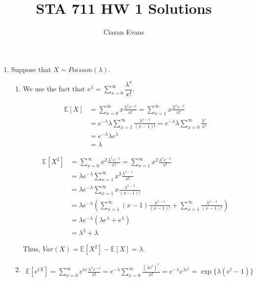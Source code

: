 \documentclass[12pt]{article}
\title{STA 711 HW 1 Solutions}
\author{Ciaran Evans}
\date{}
\begin{document}
\maketitle

\begin{enumerate}
\item Suppose that $X \sim Poisson(\lambda)$.

\begin{enumerate}
\item We use the fact that $e^\lambda = \sum \limits_{x=0}^{\infty} \dfrac{\lambda^{x}}{x!}$.

\begin{align*}
\mathbb{E}[X] &= \sum \limits_{x=0}^{\infty} x \frac{\lambda^x e^{-\lambda}}{x!} = \sum \limits_{x=1}^{\infty} x \frac{\lambda^x e^{-\lambda}}{x!} \\ 
&= e^{-\lambda} \lambda \sum \limits_{x=1}^{\infty} \frac{\lambda^{x-1}}{(x-1)!} = e^{-\lambda} \lambda \sum \limits_{x=0}^{\infty} \frac{\lambda^{x}}{x!} \\
&= e^{-\lambda} \lambda e^{\lambda} \\
&= \lambda
\end{align*}

\begin{align*}
\mathbb{E}[X^2] &= \sum \limits_{x=0}^{\infty} x^2 \frac{\lambda^x e^{-\lambda}}{x!} = \sum \limits_{x=1}^{\infty} x^2 \frac{\lambda^x e^{-\lambda}}{x!} \\
&= \lambda e^{-\lambda} \sum \limits_{x=1}^{\infty} x^2 \frac{\lambda^{x-1}}{x!} \\
&= \lambda e^{-\lambda} \sum \limits_{x=1}^{\infty} x \frac{\lambda^{x-1}}{(x-1)!} \\
&= \lambda e^{-\lambda} \left( \sum \limits_{x=1}^{\infty} (x-1) \frac{\lambda^{x-1}}{(x-1)!} +  \sum \limits_{x=1}^{\infty} \frac{\lambda^{x-1}}{(x-1)!}\right) \\
&= \lambda e^{-\lambda} \left( \lambda e^{\lambda} + e^{\lambda} \right) \\
&= \lambda^2 + \lambda
\end{align*}

Thus, $Var(X) = \mathbb{E}[X^2] - \mathbb{E}[X] = \lambda$.

\item 

\begin{align*}
\mathbb{E}[e^{tX}] = \sum \limits_{x=0}^{\infty} e^{tx} \frac{\lambda^x e^{-\lambda}}{x!} = e^{-\lambda} \sum \limits_{x=0}^\infty \frac{(\lambda e^t)^x}{x!} = e^{-\lambda} e^{\lambda e^t} = \exp\{\lambda (e^t - 1)\}
\end{align*}


\end{enumerate}
\end{enumerate}
\end{document}
